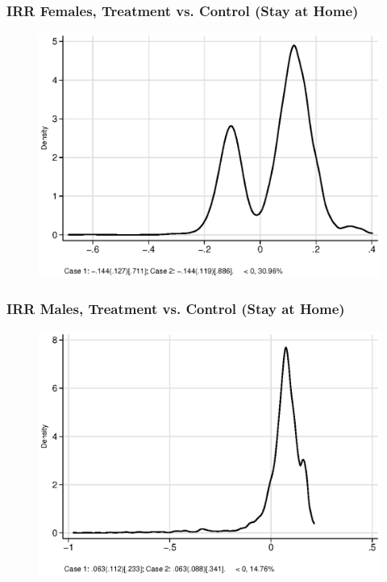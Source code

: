 \documentclass[static]{JJH-Beamer}
\begin{document}
\begin{frame}
\frametitle{IRR Females, Treatment vs. Control (Stay at Home)} 
\begin{figure}
	\includegraphics[width=.8\columnwidth]{output/irr_5_sexf.eps}
\end{figure}
\end{frame}


\begin{frame}
\frametitle{IRR Males, Treatment vs. Control (Stay at Home)} 
\begin{figure}
	\includegraphics[width=.8\columnwidth]{output/irr_5_sexm.eps}
\end{figure}
\end{frame}

\end{document}
